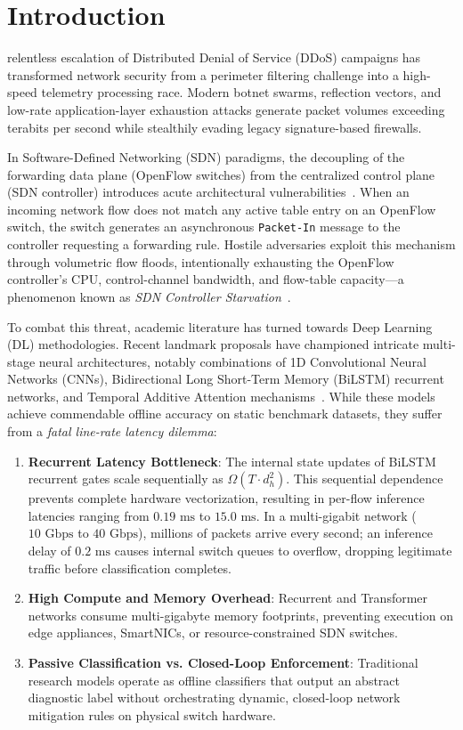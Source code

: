 \documentclass[journal]{IEEEtran}
\begin{document}
\IEEEpeerreviewmaketitle

\section{Introduction}
 relentless escalation of Distributed Denial of Service (DDoS) campaigns has transformed network security from a perimeter filtering challenge into a high-speed telemetry processing race. Modern botnet swarms, reflection vectors, and low-rate application-layer exhaustion attacks generate packet volumes exceeding terabits per second while stealthily evading legacy signature-based firewalls.

In Software-Defined Networking (SDN) paradigms, the decoupling of the forwarding data plane (OpenFlow switches) from the centralized control plane (SDN controller) introduces acute architectural vulnerabilities~\cite{mckeown2008openflow}. When an incoming network flow does not match any active table entry on an OpenFlow switch, the switch generates an asynchronous \texttt{Packet-In} message to the controller requesting a forwarding rule. Hostile adversaries exploit this mechanism through volumetric flow floods, intentionally exhausting the OpenFlow controller's CPU, control-channel bandwidth, and flow-table capacity---a phenomenon known as \textit{SDN Controller Starvation}~\cite{elsayed2020insdn, najar2024cybersecure}.

To combat this threat, academic literature has turned towards Deep Learning (DL) methodologies. Recent landmark proposals have championed intricate multi-stage neural architectures, notably combinations of 1D Convolutional Neural Networks (CNNs), Bidirectional Long Short-Term Memory (BiLSTM) recurrent networks, and Temporal Additive Attention mechanisms~\cite{najar2025ddos, sharafaldin2019developing}. While these models achieve commendable offline accuracy on static benchmark datasets, they suffer from a \textit{fatal line-rate latency dilemma}:
\begin{enumerate}
    \item \textbf{Recurrent Latency Bottleneck}: The internal state updates of BiLSTM recurrent gates scale sequentially as $\Omega(T \cdot d_h^2)$. This sequential dependence prevents complete hardware vectorization, resulting in per-flow inference latencies ranging from $0.19\text{ ms}$ to $15.0\text{ ms}$. In a multi-gigabit network ($10\text{ Gbps}$ to $40\text{ Gbps}$), millions of packets arrive every second; an inference delay of $0.2\text{ ms}$ causes internal switch queues to overflow, dropping legitimate traffic before classification completes.
    \item \textbf{High Compute and Memory Overhead}: Recurrent and Transformer networks consume multi-gigabyte memory footprints, preventing execution on edge appliances, SmartNICs, or resource-constrained SDN switches.
    \item \textbf{Passive Classification vs. Closed-Loop Enforcement}: Traditional research models operate as offline classifiers that output an abstract diagnostic label without orchestrating dynamic, closed-loop network mitigation rules on physical switch hardware.
\end{enumerate}
\end{document}
